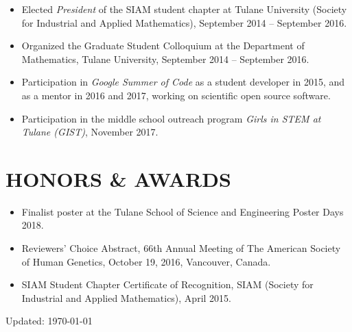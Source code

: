 \documentclass[overlapped, line, 10pt]{res} %
\begin{document}
\begin{resume}
\begin{itemize}
  \item Elected {\it President} of the SIAM student chapter at Tulane University (Society for Industrial and Applied Mathematics), September 2014 -- September 2016.
  \item Organized the Graduate Student Colloquium at the Department of Mathematics, Tulane University, September 2014 -- September 2016.
  \item Participation in \emph{Google Summer of Code} as a student developer in 2015, and as a mentor in 2016 and 2017, working on scientific open source software.
  \item Participation in the middle school outreach program \emph{Girls in STEM at Tulane (GIST)}, November 2017.
\end{itemize}


\section{HONORS \& AWARDS}

\begin{itemize}
  \item Finalist poster at the Tulane School of Science and Engineering Poster Days 2018.
  \item Reviewers’ Choice Abstract, 66th Annual Meeting of The American Society of Human Genetics, October 19, 2016, Vancouver, Canada.
  \item SIAM Student Chapter Certificate of Recognition, SIAM (Society for Industrial and Applied Mathematics), April 2015.
\end{itemize}

\vfill
\centerline{Updated: \today}


\end{resume}
\end{document}
